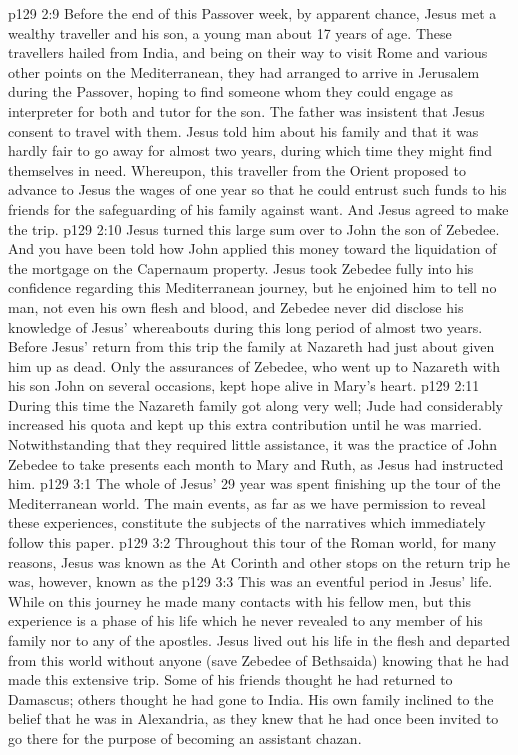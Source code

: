 \vs p129 2:9 \pc Before the end of this Passover week, by apparent chance, Jesus met a wealthy traveller and his son, a young man about 17 years of age. These travellers hailed from India, and being on their way to visit Rome and various other points on the Mediterranean, they had arranged to arrive in Jerusalem during the Passover, hoping to find someone whom they could engage as interpreter for both and tutor for the son. The father was insistent that Jesus consent to travel with them. Jesus told him about his family and that it was hardly fair to go away for almost two years, during which time they might find themselves in need. Whereupon, this traveller from the Orient proposed to advance to Jesus the wages of one year so that he could entrust such funds to his friends for the safeguarding of his family against want. And Jesus agreed to make the trip.
\vs p129 2:10 Jesus turned this large sum over to John the son of Zebedee. And you have been told how John applied this money toward the liquidation of the mortgage on the Capernaum property. Jesus took Zebedee fully into his confidence regarding this Mediterranean journey, but he enjoined him to tell no man, not even his own flesh and blood, and Zebedee never did disclose his knowledge of Jesus’ whereabouts during this long period of almost two years. Before Jesus’ return from this trip the family at Nazareth had just about given him up as dead. Only the assurances of Zebedee, who went up to Nazareth with his son John on several occasions, kept hope alive in Mary’s heart.
\vs p129 2:11 \pc During this time the Nazareth family got along very well; Jude had considerably increased his quota and kept up this extra contribution until he was married. Notwithstanding that they required little assistance, it was the practice of John Zebedee to take presents each month to Mary and Ruth, as Jesus had instructed him.
\vs p129 3:1 The whole of Jesus’ 29 year was spent finishing up the tour of the Mediterranean world. The main events, as far as we have permission to reveal these experiences, constitute the subjects of the narratives which immediately follow this paper.
\vs p129 3:2 \pc Throughout this tour of the Roman world, for many reasons, Jesus was known as the  At Corinth and other stops on the return trip he was, however, known as the 
\vs p129 3:3 This was an eventful period in Jesus’ life. While on this journey he made many contacts with his fellow men, but this experience is a phase of his life which he never revealed to any member of his family nor to any of the apostles. Jesus lived out his life in the flesh and departed from this world without anyone (save Zebedee of Bethsaida) knowing that he had made this extensive trip. Some of his friends thought he had returned to Damascus; others thought he had gone to India. His own family inclined to the belief that he was in Alexandria, as they knew that he had once been invited to go there for the purpose of becoming an assistant chazan.
